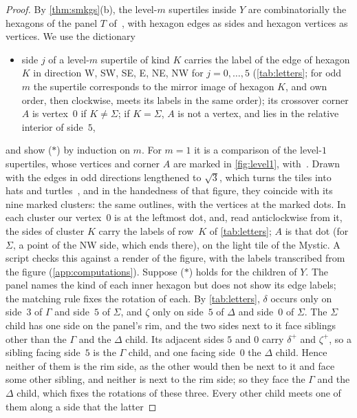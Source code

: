 \documentclass[11pt]{amsart}
\theoremstyle{definition}
\theoremstyle{remark}
\begin{document}
\begin{proof}
By \cref{thm:smkgs}(b), the level-$m$ supertiles inside $Y$ are combinatorially the hexagons of the panel $T$
of~\cite[Fig.~5.1]{SMKGS-spectre}, with hexagon edges as sides and hexagon vertices as vertices. We use the dictionary
\begin{itemize}[leftmargin=2.2em]
\item[($\ast$)] side $j$ of a level-$m$ supertile of kind $K$ carries the label of the edge of hexagon $K$ in direction
W, SW, SE, E, NE, NW for $j=0,\dots,5$ (\cref{tab:letters}; for odd $m$ the supertile corresponds to the mirror image of
hexagon $K$, and own order, then clockwise, meets its labels in the same order); its crossover corner $A$ is vertex~$0$
if $K\neq\Sigma$; if $K=\Sigma$, $A$ is not a vertex, and lies in the relative interior of side~$5$,
\end{itemize}
and show ($\ast$) by induction on $m$. For $m=1$ it is a comparison of the level-$1$ supertiles, whose vertices and
corner $A$ are marked in \cref{fig:level1}, with~\cite[Fig.~4.1]{SMKGS-spectre}. Drawn with the edges in odd directions
lengthened to $\sqrt3$, which turns the tiles into hats and turtles~\cite[\S3]{SMKGS-spectre}, and in the handedness of
that figure, they coincide with its nine marked clusters: the same outlines, with the vertices at the marked dots. In
each cluster our vertex~$0$ is at the leftmost dot, and, read anticlockwise from it, the sides of cluster $K$ carry
the labels of row~$K$ of \cref{tab:letters}; $A$ is that dot (for $\Sigma$, a point of the NW side, which ends there),
on the light tile of the Mystic. A script checks this against a render of the figure, with the labels transcribed from
the figure (\cref{app:computations}). Suppose ($\ast$) holds for the children of $Y$. The panel names the kind of each inner
hexagon but does not show its edge labels; the matching rule fixes the rotation of each. By \cref{tab:letters}, $\delta$
occurs only on side~$3$ of $\Gamma$ and side~$5$ of $\Sigma$, and $\zeta$ only on side~$5$ of $\Delta$ and side~$0$ of
$\Sigma$. The $\Sigma$ child has one side on the panel's rim, and the two sides next to it face siblings other than the
$\Gamma$ and the $\Delta$ child. Its adjacent sides $5$ and $0$ carry $\delta^+$ and $\zeta^+$, so a sibling facing
side~$5$ is the $\Gamma$ child, and one facing side~$0$ the $\Delta$ child. Hence neither of them is the rim side, as
the other would then be next to it and face some other sibling, and neither is next to the rim side; so they face the
$\Gamma$ and the $\Delta$ child, which fixes the rotations of these three. Every other child meets one of them along a side that the latter

\end{proof}
\end{document}

